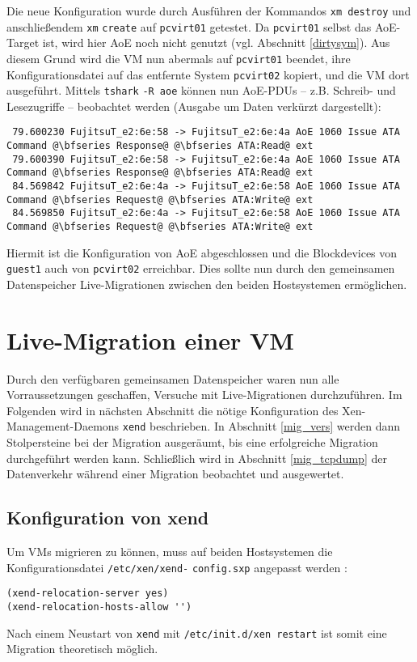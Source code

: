 Die neue Konfiguration wurde durch Ausführen der Kommandos \verb#xm destroy# und anschließendem \verb#xm# \verb#create# auf \verb#pcvirt01# getestet. Da \verb#pcvirt01# selbst das AoE-Target ist, wird hier AoE noch nicht genutzt (vgl. Abschnitt \ref{dirtysym}).
Aus diesem Grund wird die VM nun abermals auf \verb#pcvirt01# beendet, ihre Konfigurationsdatei auf das entfernte System \verb#pcvirt02# kopiert, und die VM dort ausgeführt. Mittels \verb#tshark# \verb#-R aoe# können nun AoE-PDUs -- z.B. Schreib- und Lesezugriffe -- beobachtet werden (Ausgabe um Daten verkürzt dargestellt):
\setupVerbatimOut
\begin{verbatim}
 79.600230 FujitsuT_e2:6e:58 -> FujitsuT_e2:6e:4a AoE 1060 Issue ATA Command @\bfseries Response@ @\bfseries ATA:Read@ ext
 79.600390 FujitsuT_e2:6e:58 -> FujitsuT_e2:6e:4a AoE 1060 Issue ATA Command @\bfseries Response@ @\bfseries ATA:Read@ ext
 84.569842 FujitsuT_e2:6e:4a -> FujitsuT_e2:6e:58 AoE 1060 Issue ATA Command @\bfseries Request@ @\bfseries ATA:Write@ ext
 84.569850 FujitsuT_e2:6e:4a -> FujitsuT_e2:6e:58 AoE 1060 Issue ATA Command @\bfseries Request@ @\bfseries ATA:Write@ ext
\end{verbatim}

Hiermit ist die Konfiguration von AoE abgeschlossen und die Blockdevices von \verb#guest1# auch von \verb#pcvirt02# erreichbar. Dies sollte nun durch den gemeinsamen Datenspeicher Live-Migrationen zwischen den beiden Hostsystemen ermöglichen.

\chapter{Live-Migration einer VM}\label{migr}
Durch den verfügbaren gemeinsamen Datenspeicher waren nun alle Vorraussetzungen geschaffen, Versuche mit Live-Migrationen durchzuführen. Im Folgenden wird in nächsten Abschnitt die nötige Konfiguration des Xen-Management-Daemons \verb#xend# beschrieben. In Abschnitt \ref{mig_vers} werden dann Stolpersteine bei der Migration ausgeräumt, bis eine erfolgreiche Migration durchgeführt werden kann. Schließlich wird in Abschnitt \ref{mig_tcpdump} der Datenverkehr während einer Migration beobachtet und ausgewertet.
\section{Konfiguration von xend}\label{xend_konfig}
Um VMs migrieren zu können, muss auf beiden Hostsystemen die Konfigurationsdatei \verb#/etc/xen/xend-# \verb#config.sxp# angepasst werden \cite{man_xendconfig}:
\setupVerbatimOut
\begin{verbatim}
(xend-relocation-server yes)
(xend-relocation-hosts-allow '')
\end{verbatim} 
Nach einem Neustart von \verb#xend# mit \verb#/etc/init.d/xen restart# ist somit eine Migration theoretisch möglich. 


